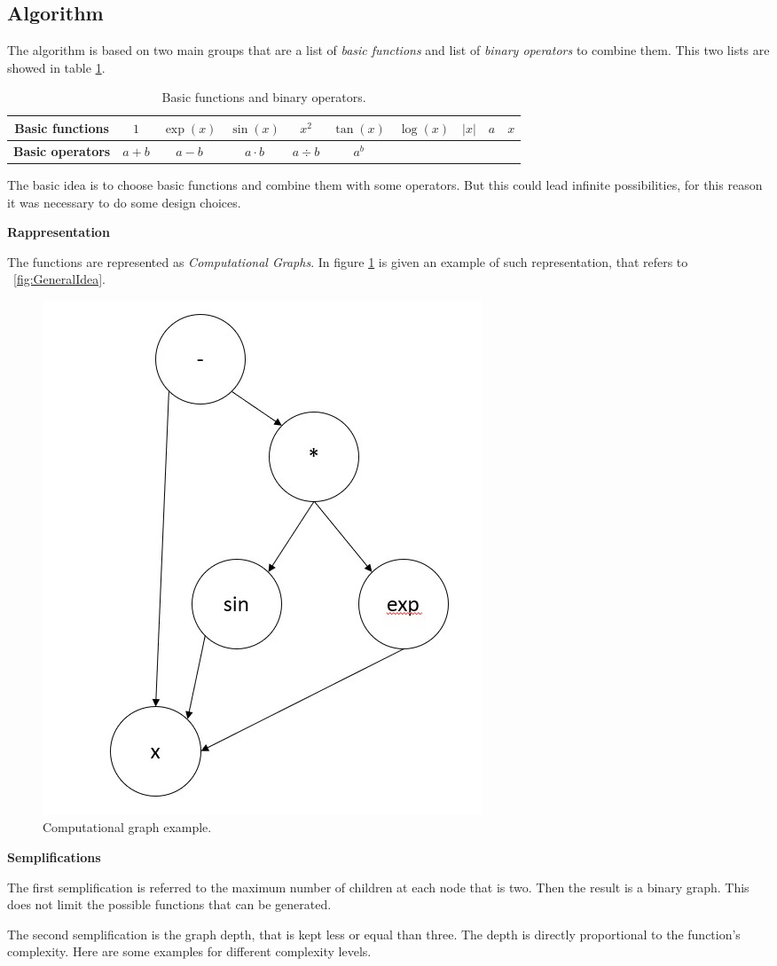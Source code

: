 \subsection{Algorithm}

The algorithm is based on two main groups that are a list of \textit{basic functions} and list of \textit{binary operators} to combine them. This two lists are showed in table \ref{tab:BasicGroups}.
\begin{table}[h!]
	\centering
	\begin{tabular}{c|ccccccccc}
		\textbf{Basic functions} & \( 1 \) & \( \exp(x) \) & \( \sin(x) \) & \( x^2 \) & \( \tan(x) \) & \( \log(x) \) & \( |x| \) & \( a \) & \( x \) \\
		\hline
		\textbf{Basic operators} & \(a+b \) & \(a-b \) & \(a \cdot b \) & \(a \div b \) & \( a^b \) & & & &
	\end{tabular}
	\caption{Basic functions and binary operators.}
	\label{tab:BasicGroups}
\end{table}

The basic idea is to choose basic functions and combine them with some operators. But this could lead infinite possibilities, for this reason it was necessary to do some design choices.

\clearpage

\textbf{Rappresentation}

The functions are represented as \textit{Computational Graphs}. In figure \ref{fig:ComputationalGraph} is given an example of such representation, that refers to \Fig~\ref{fig:GeneralIdea}.
\begin{figure}[h!]
	\centering
	\includegraphics[width=0.2\linewidth]{./ImageFiles/Data Generation/ComputationalGraph}
	\caption{Computational graph example.}
	\label{fig:ComputationalGraph}
\end{figure} 

\textbf{Semplifications}

The first semplification is referred to the maximum number of children at each node that is two. Then the result is a binary graph. This does not limit the possible functions that can be generated.

The second semplification is the graph depth, that is kept less or equal than three. The depth is directly proportional to the function's complexity. Here are some examples for different complexity levels.


